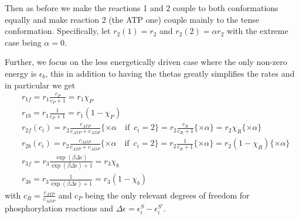 \documentclass[11pt]{article}
\begin{document}
Then as before we make the reactions 1 and 2 couple to both conformations equally and make reaction 2 (the ATP one) couple mainly to the tense conformation.
Specifically, let $r_2(1) = r_2$ and $r_2(2) = \alpha r_2$ with the extreme case being $\alpha = 0$.

Further, we focus on the less energetically driven case where the only non-zero energy is $\epsilon_b$, this in addition to having the thetas greatly simplifies the rates and in particular we get
\begin{align}
	 & r_{1f} = r_1 \frac{c_P}{c_P + 1} = r_1 \chi_P                                                                                                                                    \\
	 & r_{1b} = r_1 \frac{1}{c_P + 1} = r_1 (1-\chi_P)                                                                                                                                  \\
	 & r_{2f}(c_i) = r_2 \frac{c_{ATP}}{c_{ATP} + c_{ADP}} \{\times \alpha \quad\text{if}\enspace c_i =2\} = r_2 \frac{c_R}{c_R + 1} \{\times \alpha\} = r_2 \chi_R \{\times \alpha\}   \\
	 & r_{2b}(c_i) = r_2 \frac{c_{ADP}}{c_{ATP} + c_{ADP}} \{\times \alpha \quad\text{if}\enspace c_i =2\} = r_2 \frac{1}{c_R + 1} \{\times \alpha\} = r_2 (1-\chi_R) \{\times \alpha\} \\
	 & r_{3f} = r_3 \frac{\exp(\beta\Delta\epsilon)}{\exp(\beta\Delta\epsilon) + 1} = r_3 \chi_b                                                                                        \\
	 & r_{3b} = r_3 \frac{1}{\exp(\beta\Delta\epsilon) + 1} = r_3 (1-\chi_b)
\end{align}
with $c_R = \frac{c_{ATP}}{c_{ADP}}$ and $c_P$ being the only relevant degrees of freedom for phosphorylation reactions and $\Delta\epsilon=\epsilon_i^S-\epsilon_i^{S'}$.
\end{document}
